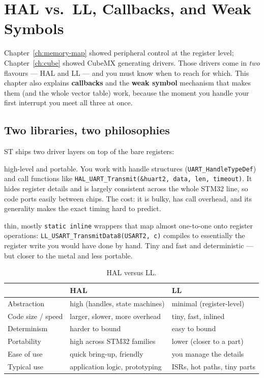 \documentclass[11pt,a4paper,oneside]{book}
\newcommand{\code}[1]{\texttt{#1}}
\begin{document}
\chapter{HAL vs.\ LL, Callbacks, and Weak Symbols}
\label{ch:hal}

Chapter~\ref{ch:memory-map} showed peripheral control at the register level;
Chapter~\ref{ch:cube} showed CubeMX generating drivers. Those drivers come in
\emph{two} flavours --- HAL and LL --- and you must know when to reach for which.
This chapter also explains \textbf{callbacks} and the \textbf{weak symbol}
mechanism that makes them (and the whole vector table) work, because the moment
you handle your first interrupt you meet all three at once.

\section{Two libraries, two philosophies}
ST ships two driver layers on top of the bare registers:
\begin{description}[leftmargin=1.6cm,style=nextline]
  \item[HAL --- Hardware Abstraction Layer] high-level and portable. You work
        with handle structures (\code{UART\_HandleTypeDef}) and call functions
        like \code{HAL\_UART\_Transmit(\&huart2, data, len, timeout)}. It hides
        register details and is largely consistent across the whole STM32 line,
        so code ports easily between chips. The cost: it is bulky, has call
        overhead, and its generality makes the exact timing hard to predict.
  \item[LL --- Low-Layer] thin, mostly \code{static inline} wrappers that map
        almost one-to-one onto register operations:
        \code{LL\_USART\_TransmitData8(USART2, c)} compiles to essentially the
        register write you would have done by hand. Tiny and fast and
        deterministic --- but closer to the metal and less portable.
\end{description}

\begin{table}[h]
\centering
\caption{HAL versus LL.}
\label{tab:hal-ll}
\small
\begin{tabular}{@{}lll@{}}
\toprule
 & \textbf{HAL} & \textbf{LL}\\
\midrule
Abstraction      & high (handles, state machines) & minimal (register-level)\\
Code size / speed & larger, slower, more overhead & tiny, fast, inlined\\
Determinism      & harder to bound                & easy to bound\\
Portability      & high across STM32 families     & lower (closer to a part)\\
Ease of use      & quick bring-up, friendly       & you manage the details\\
Typical use      & application logic, prototyping & ISRs, hot paths, tiny parts\\
\bottomrule
\end{tabular}
\end{table}
\end{document}
